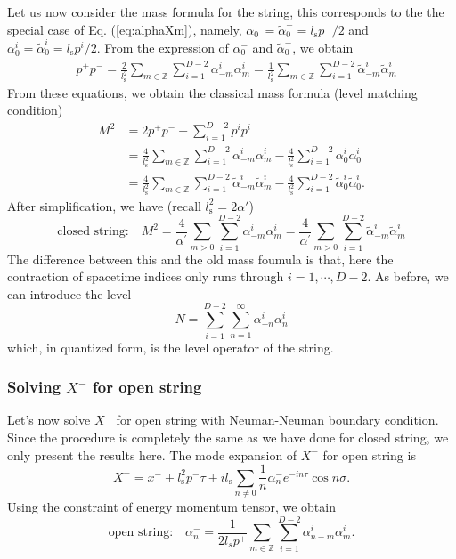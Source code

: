 \documentclass[graybox,envcountchap,sectrefs]{svmono}
\begin{document}
Let us now consider the mass formula for the string, this corresponds to the the special case of Eq. (\ref{eq:alphaXm}), namely, $\alpha_0^-=\tilde{\alpha}_0^-=l_{\mathrm{s}}p^-/2$ and $\alpha_0^i=\tilde{\alpha}_0^i=l_{\mathrm{s}}p^i/2$.
From the expression of $\alpha_0^-$ and $\tilde{\alpha}_0^-$, we obtain
\begin{align}
&p^+p^- =\frac{2}{l_{\mathrm{s}}^2}\sum_{m\in \mathbb{Z}} \sum_{i=1}^{D-2} \alpha_{-m}^{i} \alpha_{m}^{i}=\frac{1}{l_{\mathrm{s}}^2}\sum_{m\in \mathbb{Z}} \sum_{i=1}^{D-2} \tilde{\alpha}_{-m}^{i} \tilde{\alpha}_{m}^{i}
\end{align}
From these equations, we obtain the classical mass formula (level matching condition)
\begin{align}
M^2&=2p^+p^- -\sum_{i=1}^{D-2} p^ip^i \nonumber \\
&=\frac{4}{l_{\mathrm{s}}^2}\sum_{m\in \mathbb{Z}} \sum_{i=1}^{D-2} \alpha_{-m}^{i} \alpha_{m}^{i}-\frac{4}{l_{\mathrm{s}}^2}\sum_{i=1}^{D-2} \alpha^i_0\alpha^i_0 \nonumber \\
&=\frac{4}{l_{\mathrm{s}}^2}\sum_{m\in \mathbb{Z}} \sum_{i=1}^{D-2} \tilde{\alpha}_{-m}^{i} \tilde{\alpha}_{m}^{i}-\frac{4}{l_{\mathrm{s}}^2}\sum_{i=1}^{D-2} \tilde{\alpha}^i_0\tilde{\alpha}^i_0.
\end{align}
After simplification, we have (recall $l_{\mathrm{s}}^2=2\alpha'$)
\begin{equation}
\boxed{
\text{closed string:}\quad M^2=\frac{4}{\alpha^{\prime}}\sum_{m>0}\sum_{i=1}^{D-2} \alpha_{-m}^{i} \alpha_{m}^{i}=\frac{4}{\alpha^{\prime}}\sum_{m>0}\sum_{i=1}^{D-2}\tilde{\alpha}_{-m}^{i} \tilde{\alpha}_{m}^{i}
}
\end{equation}
The difference between this and the old mass foumula is that, here the contraction of spacetime indices only runs through $i=1,\cdots,D-2$. As before, we can introduce the level
\begin{equation}
N=\sum_{i=1}^{D-2} \sum_{n=1}^{\infty} \alpha_{-n}^{i} \alpha_{n}^{i}
\end{equation}
which, in quantized form, is the level operator of the string.





\subsubsection*{Solving $X^-$ for open string}

Let's now solve $X^-$ for open string with Neuman-Neuman boundary condition. Since the procedure is completely the same as we have done for closed string, we only present the results here. The mode expansion of $X^-$ for open string is
\begin{equation}
X^{-}=x^{-}+l_{\mathrm{s}}^{2} p^{-} \tau+i l_{\mathrm{s}} \sum_{n \neq 0} \frac{1}{n} \alpha_{n}^{-} e^{-i n \tau} \cos n \sigma.
\end{equation}
Using the constraint of energy momentum tensor, we obtain
\begin{equation}
\boxed{ \text{open string:}\quad\alpha_{n}^{-}=\frac{1}{2l_{s} p^{+}}\sum_{m\in \mathbb{Z}}  \sum_{i=1}^{D-2} \alpha_{n-m}^{i} \alpha_{m}^{i}. }\label{eq:light-conealpha}
\end{equation}
\end{document}
